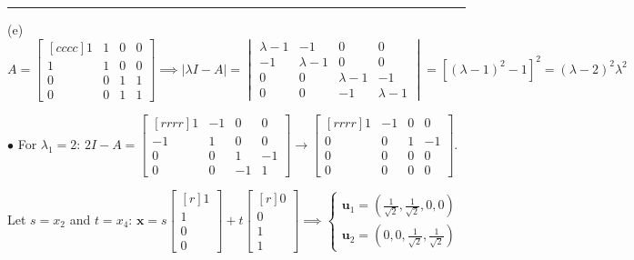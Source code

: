 \documentclass{article}
\newcommand\ddfrac[2]{\frac{\displaystyle #1}{\displaystyle #2}}
\begin{document}
    {\color{blue8} \rule{20cm}{0.3mm}}

    (e)  $A = \begin{bmatrix}[cccc]
            1 & 1 & 0 & 0\\
            1 & 1 & 0 & 0 \\
            0 & 0 & 1 & 1 \\
            0 & 0 & 1 & 1 
        \end{bmatrix} \implies | \lambda I - A| = \begin{vmatrix}
            \lambda  - 1 & -1 & 0 & 0 \\
            -1 & \lambda  - 1 & 0 & 0 \\
            0 & 0 & \lambda  - 1 & -1 \\
            0 & 0 & -1 & \lambda  - 1
        \end{vmatrix} = \left[ ( \lambda  - 1 )^2 - 1 \right]^2 = ( \lambda  - 2 )^2 \lambda ^2  $ 
        
        $\bullet$ For $ \lambda _1 = 2$: $2I - A = \begin{bmatrix}[rrrr]
            1 & -1 & 0 & 0 \\
            -1 & 1 & 0 & 0 \\
            0 & 0 & 1 & -1 \\
            0 & 0 & -1 & 1 
        \end{bmatrix} \to \begin{bmatrix}[rrrr]
            1 & -1 & 0 & 0 \\
            0 & 0 & 1 & -1 \\
            0 & 0 & 0 & 0 \\
            0 & 0 & 0 & 0 
        \end{bmatrix} $. 

        Let $s = x_2$ and $t = x_4$: $ \textbf{x} = s \begin{bmatrix}[r]
            1 \\
            1 \\
            0 \\
            0 
        \end{bmatrix} + t \begin{bmatrix}[r]
            0 \\
            0 \\
            1 \\
            1 
        \end{bmatrix} \implies \begin{cases}{}
            \textbf{u}_1 = \left( \ddfrac{1}{\sqrt{2}} , \ddfrac{1}{\sqrt{2}} , 0, 0 \right) \\
            \textbf{u}_2 = \left( 0, 0, \ddfrac{1}{\sqrt{2}} , \ddfrac{1}{\sqrt{2}}  \right) 
        \end{cases}$
\end{document}
